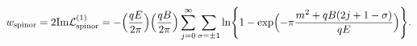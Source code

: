 \begin{equation}
w_{\rm spinor} = 2 {\rm Im} {\cal L}^{(1)}_{\rm spinor}
= - \Bigl(\frac{qE}{2 \pi} \Bigr) \Bigl(\frac{qB}{2 \pi} \Bigr) 
\sum_{j = 0}^{\infty} \sum_{\sigma = \pm 1} 
\ln \Biggl\{1 -  \exp \Bigl(- \pi \frac{m^2 
+ qB (2 j+1 - \sigma)}{qE} \Bigr) \Biggr\}. \label{f-p}
\end{equation}

